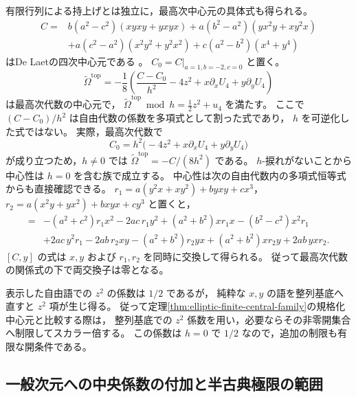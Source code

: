 有限行列による持上げとは独立に，最高次中心元の具体式も得られる。
\[
 \begin{aligned}
 C={}&b(a^2-c^2)(xyxy+yxyx)
      +a(b^2-a^2)(yx^2y+xy^2x)\\
     &+a(c^2-a^2)(x^2y^2+y^2x^2)
      +c(a^2-b^2)(x^4+y^4)
 \end{aligned}
\]
はDe Laetの四次中心元である
\cite[Section 5.2, Theorem 5.3]{DeLaet2017}。
$C_0=C|_{a=1,b=-2,c=0}$ と置く。
\[
 \widetilde\Omega^{\mathrm{top}}
  =-\frac18\left(
       \frac{C-C_0}{h^2}-4z^2+x\partial_xU_4+y\partial_yU_4
      \right)
\]
は最高次代数の中心元で，
$\widetilde\Omega^{\mathrm{top}}\bmod h=\frac12z^2+u_4$ を満たす。
ここで $(C-C_0)/h^2$ は自由代数の係数を多項式として割った式であり，
$h$ を可逆化した式ではない。
実際，最高次代数で
\[
 C_0=h^2\bigl(-4z^2+x\partial_xU_4+y\partial_yU_4\bigr)
\]
が成り立つため，$h\ne0$ では
$\widetilde\Omega^{\mathrm{top}}=-C/(8h^2)$ である。
$h$-捩れがないことから中心性は $h=0$ を含む族で成立する。
中心性は次の自由代数内の多項式恒等式からも直接確認できる。
$r_1=a(y^2x+xy^2)+byxy+cx^3$，$r_2=a(x^2y+yx^2)+bxyx+cy^3$ と置くと，
\begin{align*}
 [C,x]={}&-(a^2+c^2)r_1x^2-2ac\,r_1y^2
          +(a^2+b^2)xr_1x-(b^2-c^2)x^2r_1\\
         &+2ac\,y^2r_1-2ab\,r_2xy-(a^2+b^2)r_2yx
          +(a^2+b^2)xr_2y+2ab\,yxr_2.
\end{align*}
$[C,y]$ の式は $x,y$ および $r_1,r_2$ を同時に交換して得られる。
従って最高次代数の関係式の下で両交換子は零となる。

表示した自由語での $z^2$ の係数は $1/2$ であるが，
純粋な $x,y$ の語を整列基底へ直すと $z^2$ 項が生じ得る。
従って定理\ref{thm:elliptic-finite-central-family}の規格化中心元と比較する際は，
整列基底での $z^2$ 係数を用い，必要ならその非零開集合へ制限してスカラー倍する。
この係数は $h=0$ で $1/2$ なので，追加の制限も有限な開条件である。

\subsection{一般次元への中央係数の付加と半古典極限の範囲}

